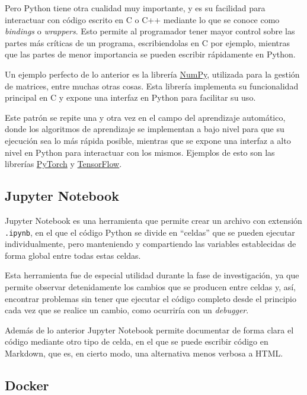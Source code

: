 Pero Python tiene otra cualidad muy importante, y es su facilidad para
interactuar con código escrito en C o C++ mediante lo que se conoce como
\textit{bindings} o \textit{wrappers}. Esto permite al programador tener mayor
control sobre las partes más críticas de un programa, escribiendolas en C por
ejemplo, mientras que las partes de menor importancia se pueden escribir
rápidamente en Python.

Un ejemplo perfecto de lo anterior es la librería
\href{https://github.com/numpy/numpy}{NumPy}, utilizada para la gestión de
matrices, entre muchas otras cosas. Esta librería implementa su funcionalidad
principal en C y expone una interfaz en Python para facilitar su uso.

Este patrón se repite una y otra vez en el campo del aprendizaje automático,
donde los algoritmos de aprendizaje se implementan a bajo nivel para que su
ejecución sea lo más rápida posible, mientras que se expone una interfaz a alto
nivel en Python para interactuar con los mismos. Ejemplos de esto son las
librerías \href{https://github.com/pytorch/pytorch}{PyTorch} y
\href{https://github.com/tensorflow/tensorflow}{TensorFlow}.

\subsection{Jupyter Notebook}

Jupyter Notebook es una herramienta que permite crear un archivo con extensión
\texttt{.ipynb}, en el que el código Python se divide en ``celdas'' que se
pueden ejecutar individualmente, pero manteniendo y compartiendo las variables
establecidas de forma global entre todas estas celdas.

Esta herramienta fue de especial utilidad durante la fase de investigación, ya
que permite observar detenidamente los cambios que se producen entre celdas y,
así, encontrar problemas sin tener que ejecutar el código completo desde el
principio cada vez que se realice un cambio, como ocurriría con un
\textit{debugger}.

Además de lo anterior Jupyter Notebook permite documentar de forma clara el
código mediante otro tipo de celda, en el que se puede escribir código en
Markdown, que es, en cierto modo, una alternativa menos verbosa a HTML.

\subsection{Docker}

